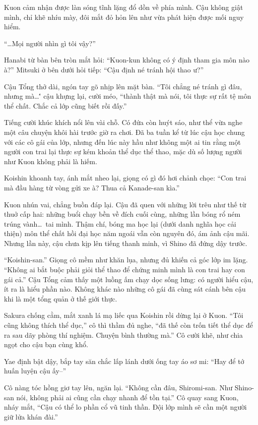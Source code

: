 \documentclass[../main.tex]{subfiles}
\begin{document}
Kuon cảm nhận được làn sóng tĩnh lặng đổ dồn về phía mình. Cậu không giật mình, chỉ khẽ nhíu mày, đôi mắt đỏ hỏn lên như vừa phát hiện được mối nguy hiểm.

``\dots Mọi người nhìn gì tôi vậy?''

Hanabi từ bàn bên tròn mắt hỏi: ``Kuon-kun không có ý định tham gia môn nào à?'' Mitsuki ở bên dưới hỏi tiếp: ``Cậu định né tránh hội thao ư?''

Cậu Tổng thở dài, ngón tay gõ nhịp lên mặt bàn. ``Tôi chẳng né tránh gì đâu, nhưng mà\dots\'' cậu khựng lại, cười méo, ``thành thật mà nói, tôi thực sự rất tệ môn thể chất. Chắc cả lớp cũng biết rồi đấy.''

Tiếng cười khúc khích nổi lên vài chỗ. Có đứa còn huýt sáo, như thể vừa nghe một câu chuyện khôi hài trước giờ ra chơi. Đã ba tuần kể từ lúc cậu học chung với các cô gái của lớp, nhưng đến lúc này hầu như không một ai tin rằng một người con trai lại thực sự kém khoản thể dục thể thao, mặc dù số lượng người như Kuon không phải là hiếm.

Koishin khoanh tay, ánh mắt nheo lại, giọng có gì đó hơi chảnh chọe: ``Con trai mà đầu hàng từ vòng gửi xe à? Thua cả Kanade-san kìa.''

Kuon nhún vai, chẳng buồn đáp lại. Cậu đã quen với những lời trêu như thế từ thuở cấp hai: những buổi chạy bền về đích cuối cùng, những lần bóng rổ ném trúng vành\dots\ tai mình. Thậm chí, bóng ma học lại (dưới danh nghĩa học cải thiện) môn thể chất hồi đại học năm ngoái vẫn còn nguyên đó, ám ảnh cậu mãi. Nhưng lần này, cậu chưa kịp lên tiếng thanh minh, vì Shino đã đứng dậy trước.

``Koishin-san.'' Giọng cô mềm như khăn lụa, nhưng đủ khiến cả góc lớp im lặng. ``Không ai bắt buộc phải giỏi thể thao để chứng minh mình là con trai hay con gái cả.'' Cậu Tổng cảm thấy một luồng ấm chạy dọc sống lưng: có người hiểu cậu, ít ra là hiểu phần nào. Không khác nào những cô gái đã cùng sát cánh bên cậu khi là một tổng quản ở thế giới thực.

Sakura chống cằm, mắt xanh lá mạ liếc qua Koishin rồi dừng lại ở Kuon. ``Tôi cũng không thích thể dục,'' cô thì thầm đủ nghe, ``đã thế còn trốn tiết thể dục để ra sau dãy phòng thí nghiệm. Chuyện bình thường mà.'' Cô cười khẽ, như chia ngọt cho cậu bạn cùng khổ.

Yae định bật dậy, bắp tay săn chắc lấp lánh dưới ống tay áo sơ mi: ``Hay để tớ huấn luyện cậu ấy--''

Cô nàng tóc hồng giơ tay lên, ngăn lại. ``Không cần đâu, Shiromi-san. Như Shino-san nói, không phải ai cũng cần chạy nhanh để tồn tại.'' Cô quay sang Kuon, nháy mắt, ``Cậu có thể lo phần cổ vũ tinh thần. Đội lớp mình sẽ cần một người giữ lửa khán đài.''
\end{document}
